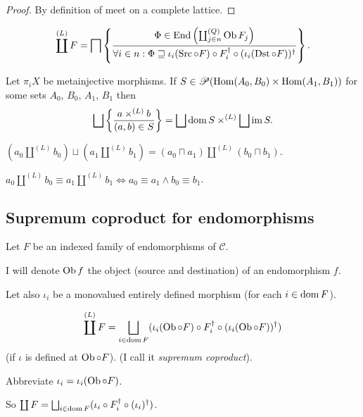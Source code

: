 \begin{proof}
  By definition of meet on a complete lattice.
\end{proof}

\begin{cor}
  \[ \coprod^{(L)} F = \bigsqcap \left\{ \frac{ \Phi \in \operatorname{End} \left(
  \coprod^{(Q)}_{j \in n} \operatorname{Ob} F_j \right) }{
  \forall i \in n : \Phi \sqsupseteq \iota_i(\operatorname{Src}\circ F) \circ F_i^{\dagger} \circ (\iota_i(\operatorname{Dst}\circ F))^{\dagger} }\right\}. \]
\end{cor}

\begin{thm}
  Let $\pi_i X$ be metainjective morphisms. If $S \in \mathscr{P} (\operatorname{Hom}
  (A_0 , B_0) \times \operatorname{Hom} (A_1 , B_1))$ for some sets $A_0$, $B_0$,
  $A_1$, $B_1$ then
  \[ \bigsqcup \setcond{ a \times^{(L)} b }{ (a , b)
     \in S } = \bigsqcup \dom S \times^{(L)} \bigsqcup \im
     S. \]
\end{thm}

\begin{cor}
  $(a_0 \amalg^{(L)} b_0) \sqcup (a_1 \amalg^{(L)} b_1) = (a_0 \sqcap a_1)
  \amalg^{(L)} (b_0 \sqcap b_1)$.
\end{cor}

\begin{cor}
  $a_0 \amalg^{(L)} b_0 \equiv a_1 \amalg^{(L)} b_1 \Leftrightarrow a_0 \equiv
  a_1 \wedge b_0 \equiv b_1$.
\end{cor}

\subsection{Supremum coproduct for endomorphisms}

Let $F$ be an indexed family of endomorphisms of $\mathcal{C}$.

I will denote $\operatorname{Ob} f$ the object (source and destination) of an
endomorphism $f$.

Let also $\iota_i$ be a monovalued entirely defined morphism (for each $i \in
\operatorname{dom} F$).

\begin{defn}
  \[ \coprod^{(L)} F = \bigsqcup_{i \in \dom F} (\iota_i(\Ob\circ F) \circ F_i^{\dagger} \circ (\iota_i(\Ob\circ F))^{\dagger}) \]
  (if $\iota$ is defined at $\operatorname{Ob}\circ F$). (I call it \emph{supremum coproduct}).
\end{defn}

Abbreviate $\iota_i = \iota_i(\operatorname{Ob}\circ F)$.

So $\coprod F = \bigsqcup_{i \in \dom F} (\iota_i \circ F_i^{\dagger}
\circ (\iota_i)^{\dagger})$.

